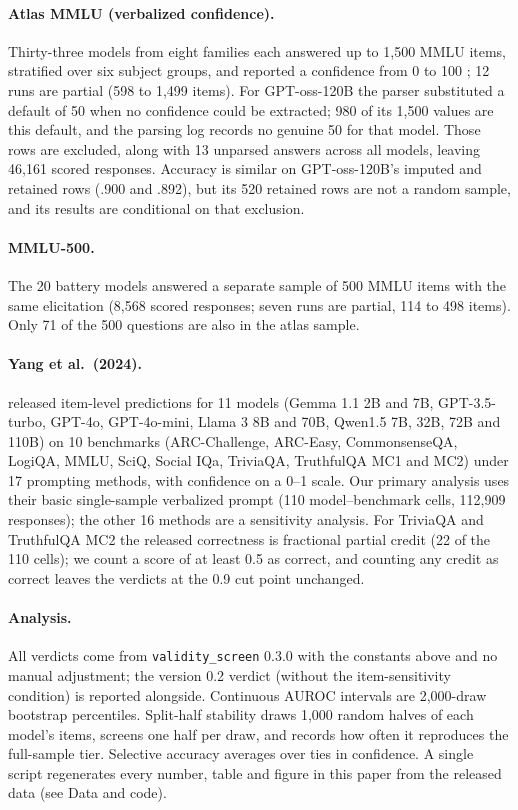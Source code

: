 \documentclass[11pt,a4paper]{article}
\begin{document}
\paragraph{Atlas MMLU (verbalized confidence).} Thirty-three models from eight families each answered up to 1,500 MMLU items, stratified over six subject groups, and reported a confidence from 0 to 100 \citep{cacioli2026atlas}; 12 runs are partial (598 to 1,499 items). For GPT-oss-120B the parser substituted a default of 50 when no confidence could be extracted; 980 of its 1,500 values are this default, and the parsing log records no genuine 50 for that model. Those rows are excluded, along with 13 unparsed answers across all models, leaving 46,161 scored responses. Accuracy is similar on GPT-oss-120B's imputed and retained rows (.900 and .892), but its 520 retained rows are not a random sample, and its results are conditional on that exclusion.

\paragraph{MMLU-500.} The 20 battery models answered a separate sample of 500 MMLU items with the same elicitation (8,568 scored responses; seven runs are partial, 114 to 498 items). Only 71 of the 500 questions are also in the atlas sample.

\paragraph{Yang et al.\ (2024).} \citet{yang2024} released item-level predictions for 11 models (Gemma 1.1 2B and 7B, GPT-3.5-turbo, GPT-4o, GPT-4o-mini, Llama 3 8B and 70B, Qwen1.5 7B, 32B, 72B and 110B) on 10 benchmarks (ARC-Challenge, ARC-Easy, CommonsenseQA, LogiQA, MMLU, SciQ, Social IQa, TriviaQA, TruthfulQA MC1 and MC2) under 17 prompting methods, with confidence on a 0--1 scale. Our primary analysis uses their basic single-sample verbalized prompt (110 model--benchmark cells, 112,909 responses); the other 16 methods are a sensitivity analysis. For TriviaQA and TruthfulQA MC2 the released correctness is fractional partial credit (22 of the 110 cells); we count a score of at least 0.5 as correct, and counting any credit as correct leaves the verdicts at the 0.9 cut point unchanged.

\paragraph{Analysis.} All verdicts come from \texttt{validity\_screen} 0.3.0 with the constants above and no manual adjustment; the version 0.2 verdict (without the item-sensitivity condition) is reported alongside. Continuous AUROC intervals are 2,000-draw bootstrap percentiles. Split-half stability draws 1,000 random halves of each model's items, screens one half per draw, and records how often it reproduces the full-sample tier. Selective accuracy averages over ties in confidence. A single script regenerates every number, table and figure in this paper from the released data (see Data and code).
\end{document}
